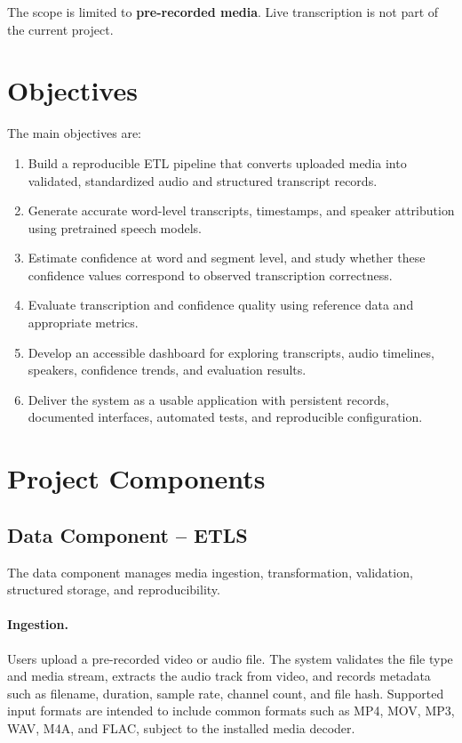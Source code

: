 \documentclass[11pt,a4paper]{article}
\begin{document}
The scope is limited to \textbf{pre-recorded media}. Live transcription is
not part of the current project.

\section{Objectives}

The main objectives are:
\begin{enumerate}
  \item Build a reproducible ETL pipeline that converts uploaded media into
  validated, standardized audio and structured transcript records.
  \item Generate accurate word-level transcripts, timestamps, and speaker
  attribution using pretrained speech models.
  \item Estimate confidence at word and segment level, and study whether
  these confidence values correspond to observed transcription correctness.
  \item Evaluate transcription and confidence quality using reference data and
  appropriate metrics.
  \item Develop an accessible dashboard for exploring transcripts, audio
  timelines, speakers, confidence trends, and evaluation results.
  \item Deliver the system as a usable application with persistent records,
  documented interfaces, automated tests, and reproducible configuration.
\end{enumerate}

\section{Project Components}

\subsection{Data Component -- ETLS}

The data component manages media ingestion, transformation, validation,
structured storage, and reproducibility.

\paragraph{Ingestion.}
Users upload a pre-recorded video or audio file. The system validates the
file type and media stream, extracts the audio track from video, and records
metadata such as filename, duration, sample rate, channel count, and file
hash. Supported input formats are intended to include common formats such as
MP4, MOV, MP3, WAV, M4A, and FLAC, subject to the installed media decoder.
\end{document}
